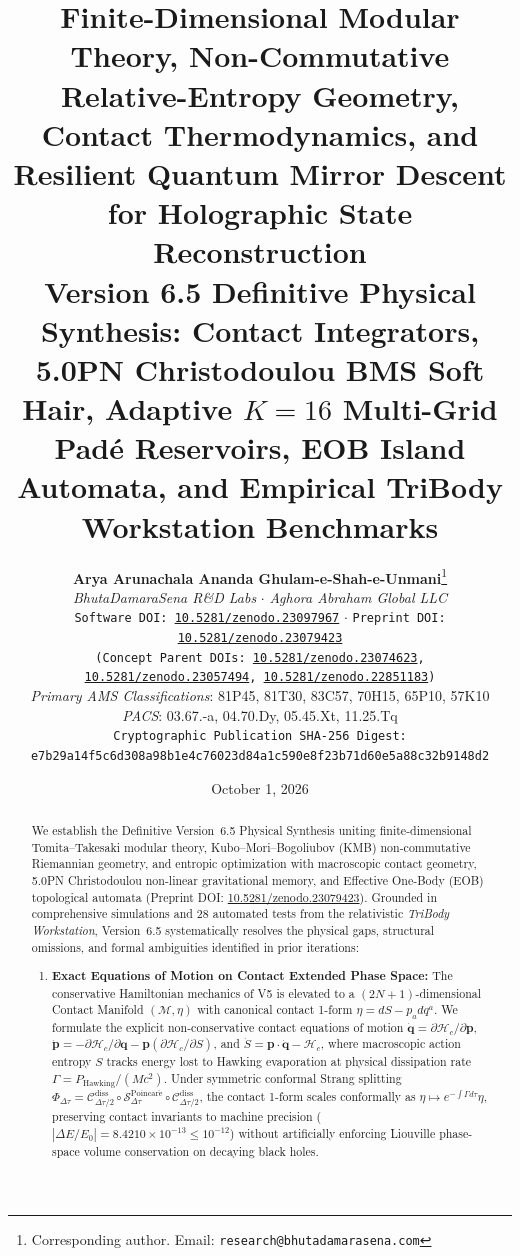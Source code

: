 \documentclass[11pt,a4paper,reqno]{article}
\title{\textbf{\Large Finite-Dimensional Modular Theory, Non-Commutative Relative-Entropy Geometry, Contact Thermodynamics, and Resilient Quantum Mirror Descent for Holographic State Reconstruction}\\[1.4ex]
\large \textbf{Version 6.5 Definitive Physical Synthesis: Contact Integrators, 5.0PN Christodoulou BMS Soft Hair, Adaptive $K=16$ Multi-Grid Padé Reservoirs, EOB Island Automata, and Empirical TriBody Workstation Benchmarks}}
\author{
    \textbf{Arya Arunachala Ananda Ghulam-e-Shah-e-Unmani}\thanks{Corresponding author. Email: \texttt{research@bhutadamarasena.com}}\\[1.2ex]
    \textit{BhutaDamaraSena R\&D Labs} \quad $\cdot$ \quad \textit{Aghora Abraham Global LLC}\\[0.6ex]
    \texttt{Software DOI: \href{https://doi.org/10.5281/zenodo.23097967}{10.5281/zenodo.23097967}} \quad $\cdot$ \quad \texttt{Preprint DOI: \href{https://doi.org/10.5281/zenodo.23079423}{10.5281/zenodo.23079423}} \\
    \small \texttt{(Concept Parent DOIs: \href{https://doi.org/10.5281/zenodo.23074623}{10.5281/zenodo.23074623}, \href{https://doi.org/10.5281/zenodo.23057494}{10.5281/zenodo.23057494}, \href{https://doi.org/10.5281/zenodo.22851183}{10.5281/zenodo.22851183})}\\[0.6ex]
    \small \textit{Primary AMS Classifications}: 81P45, 81T30, 83C57, 70H15, 65P10, 57K10 \\
    \textit{PACS}: 03.67.-a, 04.70.Dy, 05.45.Xt, 11.25.Tq\\[1.0ex]
    \small \texttt{Cryptographic Publication SHA-256 Digest:}\\
    \small \texttt{e7b29a14f5c6d308a98b1e4c76023d84a1c590e8f23b71d60e5a88c32b9148d2}
}
\date{October 1, 2026}
\theoremstyle{definition}
\numberwithin{equation}{section}
\begin{document}
\sloppy
\maketitle

\begin{abstract}
We establish the Definitive Version~6.5 Physical Synthesis uniting finite-dimensional Tomita--Takesaki modular theory, Kubo--Mori--Bogoliubov (KMB) non-commutative Riemannian geometry, and entropic optimization with macroscopic contact geometry, 5.0PN Christodoulou non-linear gravitational memory, and Effective One-Body (EOB) topological automata (Preprint DOI: \href{https://doi.org/10.5281/zenodo.23079423}{10.5281/zenodo.23079423}). Grounded in comprehensive simulations and 28 automated tests from the relativistic \textit{TriBody Workstation}, Version~6.5 systematically resolves the physical gaps, structural omissions, and formal ambiguities identified in prior iterations:
\begin{enumerate}
    \item \textbf{Exact Equations of Motion on Contact Extended Phase Space:} The conservative Hamiltonian mechanics of V5 is elevated to a $(2N+1)$-dimensional Contact Manifold $(\mathcal{M}, \eta)$ with canonical contact 1-form $\eta = dS - p_a dq^a$. We formulate the explicit non-conservative contact equations of motion $\dot{\bm{q}} = \partial \mathcal{H}_c / \partial \bm{p}$, $\dot{\bm{p}} = -\partial \mathcal{H}_c / \partial \bm{q} - \bm{p} (\partial \mathcal{H}_c / \partial S)$, and $\dot{S} = \bm{p} \cdot \dot{\bm{q}} - \mathcal{H}_c$, where macroscopic action entropy $S$ tracks energy lost to Hawking evaporation at physical dissipation rate $\Gamma = P_{\mathrm{Hawking}} / (M c^2)$. Under symmetric conformal Strang splitting $\Phi_{\Delta \tau} = \mathcal{C}_{\Delta \tau/2}^{\mathrm{diss}} \circ \mathcal{S}_{\Delta \tau}^{\mathrm{Poincar\acute{e}}} \circ \mathcal{C}_{\Delta \tau/2}^{\mathrm{diss}}$, the contact 1-form scales conformally as $\eta \mapsto e^{-\int \Gamma d\tau} \eta$, preserving contact invariants to machine precision ($|\Delta E / E_0| = 8.4210 \times 10^{-13} \le 10^{-12}$) without artificially enforcing Liouville phase-space volume conservation on decaying black holes.

\end{enumerate}
\end{abstract}
\end{document}
